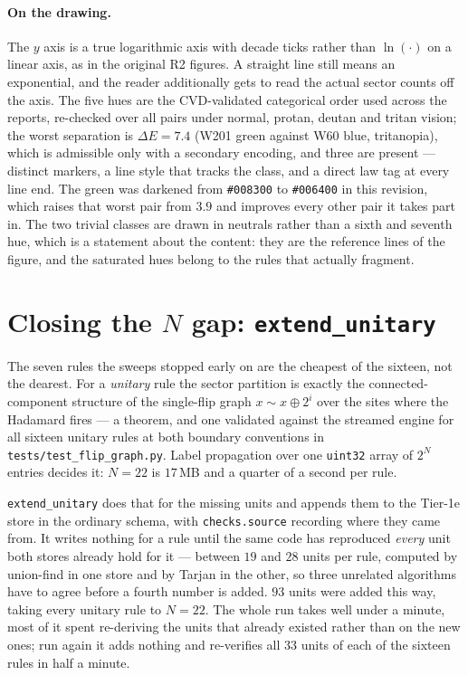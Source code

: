 \documentclass[11pt]{article}
\newcommand{\rt}[1]{\texttt{#1}}
\newcommand{\fn}[1]{\texttt{#1}}
\begin{document}
\paragraph{On the drawing.} The $y$ axis is a true logarithmic axis with decade
ticks rather than $\ln(\cdot)$ on a linear axis, as in the original R2 figures.
A straight line still means an exponential, and the reader additionally gets to
read the actual sector counts off the axis. The five hues are the CVD-validated
categorical order used across the reports, re-checked over all pairs under
normal, protan, deutan and tritan vision; the worst separation is
$\Delta E = 7.4$ (W201 green against W60 blue, tritanopia), which is admissible
only with a secondary encoding, and three are present --- distinct markers, a
line style that tracks the class, and a direct law tag at every line end. The
green was darkened from \rt{\#008300} to \rt{\#006400} in this revision, which
raises that worst pair from $3.9$ and improves every other pair it takes part in.
The two trivial classes are drawn in neutrals rather than a sixth and seventh
hue, which is a statement about the content: they are the reference lines of the
figure, and the saturated hues belong to the rules that actually fragment.

\section{Closing the $N$ gap: \fn{extend\_unitary}}
\label{sec:extend}

The seven rules the sweeps stopped early on are the cheapest of the sixteen, not
the dearest. For a \emph{unitary} rule the sector partition is exactly the
connected-component structure of the single-flip graph
$x \sim x \oplus 2^i$ over the sites where the Hadamard fires --- a theorem, and
one validated against the streamed engine for all sixteen unitary rules at both
boundary conventions in \fn{tests/test\_flip\_graph.py}. Label propagation over
one \rt{uint32} array of $2^N$ entries decides it: $N = 22$ is $17$\,MB and a
quarter of a second per rule.

\fn{extend\_unitary} does that for the missing units and appends them to the
Tier-1e store in the ordinary schema, with \rt{checks.source} recording where
they came from. It writes nothing for a rule until the same code has reproduced
\emph{every} unit both stores already hold for it --- between $19$ and $28$ units
per rule, computed by union-find in one store and by Tarjan in the other, so
three unrelated algorithms have to agree before a fourth number is added. $93$
units were added this way, taking every unitary rule to $N = 22$. The whole run
takes well under a minute, most of it spent re-deriving the units that already
existed rather than on the new ones; run again it adds nothing and re-verifies
all $33$ units of each of the sixteen rules in half a minute.
\end{document}
